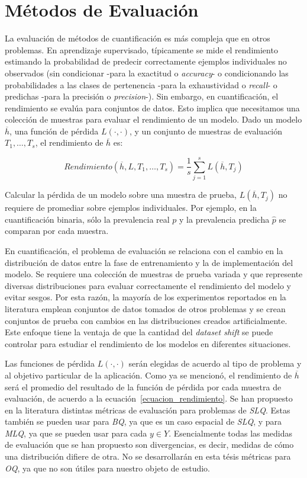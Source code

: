 \chapter{Métodos de Evaluación}

La evaluación de métodos de cuantificación es más compleja que en otros
problemas. En aprendizaje supervisado, típicamente se mide el rendimiento
estimando la probabilidad de predecir correctamente ejemplos individuales no
observados (sin condicionar -para la exactitud o {\it accuracy\/}- o
condicionando las probabilidades a las clases de pertenencia -para la
exhaustividad o {\it recall\/}- o predichas -para la precisión o {\it
precision\/}-). Sin embargo, en cuantificación, el rendimiento se evalúa para
conjuntos de datos. Esto implica que necesitamos una colección de muestras para
evaluar el rendimiento de un modelo. Dado un modelo $\overline{h}$, una función
de pérdida $L(\cdot, \cdot)$, y un conjunto de muestras de evaluación ${T_1,
\dots, T_s}$, el rendimiento de $\overline{h}$ es:

\begin{equation}
    Rendimiento(\overline{h}, L, {T_1, \dots , T_s}) = \frac{1}{s}
    \sum_{j=1}^{s}L(\overline{h}, T_j)
    \label{ecuacion_rendimiento}
\end{equation}

Calcular la pérdida de un modelo sobre una muestra de prueba, $L(\overline{h},
T_j)$ no requiere de promediar sobre ejemplos individuales. Por ejemplo, en la
cuantificación binaria, sólo la prevalencia real $p$ y la prevalencia predicha
$\hat{p}$ se comparan por cada muestra.

En cuantificación, el problema de evaluación se relaciona con el cambio en la
distribución de datos entre la fase de entrenamiento y la de implementación del
modelo. Se requiere una colección de muestras de prueba variada y que represente
diversas distribuciones para evaluar correctamente el rendimiento del modelo y
evitar sesgos. Por esta razón, la mayoría de los experimentos reportados en la
literatura emplean conjuntos de datos tomados de otros problemas y se crean
conjuntos de prueba con cambios en las distribuciones creados artificialmente.
Este enfoque tiene la ventaja de que la cantidad del {\it dataset shift\/} se
puede controlar para estudiar el rendimiento de los modelos en diferentes
situaciones.

Las funciones de pérdida $L(\cdot, \cdot)$ serán elegidas de acuerdo al tipo de
problema y al objetivo particular de la aplicación. Como ya se mencionó, el
rendimiento de $\overline{h}$ será el promedio del resultado de la función de
pérdida por cada muestra de evaluación, de acuerdo a la
ecuación~\ref{ecuacion_rendimiento}. Se han propuesto en la literatura distintas
métricas de evaluación para problemas de {\it SLQ}. Estas también se pueden usar
para {\it BQ}, ya que es un caso espacial de {\it SLQ}, y para {\it MLQ}, ya que
se pueden usar para cada $y \in Y$. Esencialmente todas las medidas de
evaluación que se han propuesto son divergencias, es decir, medidas de cómo una
distribución difiere de otra. No se desarrollarán en esta tésis métricas para
{\it OQ}, ya que no son útiles para nuestro objeto de estudio.

